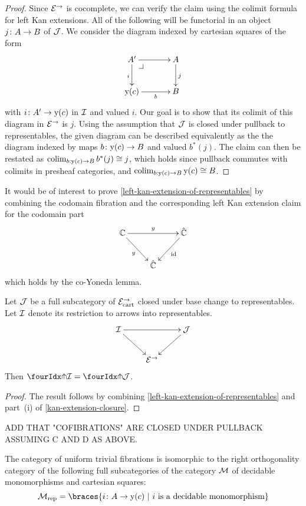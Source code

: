 \documentclass[reqno,10pt,a4paper,oneside]{amsart}
\begin{document}
\begin{proof}
Since $\catE^{\to}$ is cocomplete, we can verify the claim using  the colimit formula for left Kan extensions.
All of the following will be functorial in an object $j \co A \to B$ of $\cal{J}$.
We consider the diagram indexed by cartesian squares of the form
\[
\xymatrix@C=1.2cm{
  A'
  \ar[r]
  \ar[d]_{i}
  \pullback{dr}
&
  A
  \ar[d]^{j}
\\
  \yon(c) 
  \ar[r]_-b 
&
  B
}
\]
with $i \co A' \to \yon(c)$ in $\cal{I}$ and valued $i$.
Our goal is to show that its colimit of this diagram in $\catE^{\to}$ is $j$.
Using the assumption that $\cal{J}$ is closed under pullback to representables, the given diagram
can be described equivalently as the the diagram indexed by maps $b \co \yon(c) \to B$ and valued $b^*(j)$. The claim can then be restated as  $\colim_{b : \yon(c) \to B} b^*(j) \iso j$, which 
holds since pullback commutes with colimits in presheaf categories, and  $\colim_{b : \yon(c) \to B} \yon(c) \iso B$.
\end{proof}


\begin{remark} It would be of interest to prove \cref{left-kan-extension-of-representables} by combining 
the codomain fibration and the corresponding left Kan extension claim for the codomain part
\[
\xymatrix{
  \cat{C}
  \ar[rr]^{y}
  \ar[dr]_{y}
&&
  \hat{\catC}
  \ar[dl]^{\id}
\\&
  \hat{\cat{C}}
}
\]
which holds by the co-Yoneda lemma.
\end{remark}



\begin{lemma}
\label{awfs-on-arrows-into-representables}
Let $\cal{J}$ be a full subcategory of $\catE_{\cart}^{\to}$ closed under base change to representables.
Let $\cal{I}$ denote its restriction to arrows into representables.
\[
\xymatrix{
  \cal{I}
  \ar[rr]
  \ar[dr]
&&
  \cal{J}
  \ar[dl]
\\&
  \catE^{\to}
}
\]
Then $\liftr{\cal{I}} = \liftr{\cal{J}}$.
\end{lemma}

\begin{proof} The result follows by combining \cref{left-kan-extension-of-representables} and part~(i) of \cref{kan-extension-closure}. 
\end{proof}

ADD THAT "COFIBRATIONS" ARE CLOSED UNDER PULLBACK ASSUMING C AND D AS ABOVE.


\begin{theorem} \label{small-gen-triv-kan}
The category of uniform trivial  fibrations is isomorphic to the right orthogonality 
category of the following full subcategories of  the category $\cal{M}$ of decidable
monomorphisms and cartesian squares:
\[
\cal{M}_{\textup{rep}}  = \braces{i \co A \rightarrow \yon(c) \ | \ i \text{ is a  decidable monomorphism} } 
\]
\end{theorem}
\end{document}
